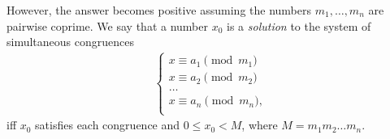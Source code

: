 \documentclass[12pt,notitlepage]{article}
\theoremstyle{plain}
\theoremstyle{definition}
\theoremstyle{plain}
\newcommand{\1}{\mathbf{1}}
\newcommand{\0}{\mathbf{0}}
\begin{document}
However, the answer becomes positive assuming the numbers $m_1, \ldots, m_n$ are pairwise coprime.  We say that a number $x_0$ is a \emph{solution} to the system of simultaneous congruences
\begin{equation}\label{L6:eq5}
\begin{array}{l}
\begin{cases}
	 x \equiv a_1 \pmod {m_1}\\
	 x \equiv a_2 \pmod {m_2}\\
	 \ldots\\
	 x \equiv a_n \pmod {m_n},\\
\end{cases}
\end{array}
\end{equation}
iff $x_0$ satisfies each congruence and $0 \leq x_0 < M$, where $M = m_1 m_2 \ldots m_n$.
\end{document}
